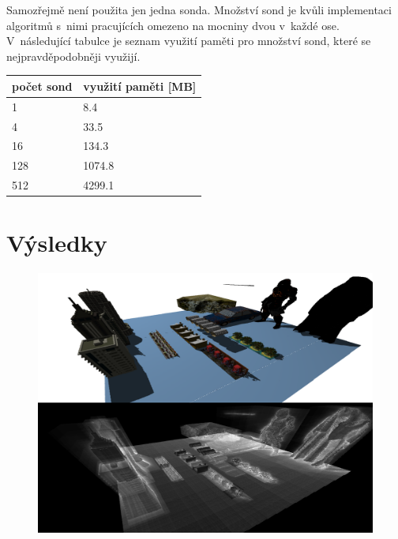 Samozřejmě není použita jen jedna sonda. Množství sond je kvůli implementaci algoritmů s~nimi pracujících omezeno na mocniny dvou v~každé ose. V~následující tabulce je seznam využití paměti pro množství sond, které se nejpravděpodobněji využijí.

\begin{table}[H]
	\centering
    \begin{tabular}{|l|l|}
    \hline
    počet sond & využití paměti {[}MB{]} \\ \hline
    1          & 8.4                     \\ \hline
    4          & 33.5                    \\ \hline
    16         & 134.3                   \\ \hline
    128        & 1074.8                  \\ \hline
    512        & 4299.1                  \\ \hline
    \end{tabular}
	\captionsetup{justification=centering}
\end{table}


\section{Výsledky}

\begin{figure}[H]
	\centering
	\captionsetup{justification=centering}
	\includegraphics[scale=0.2]{images/12M_scene.png}
	\label{fig:12M_render}
\end{figure}



